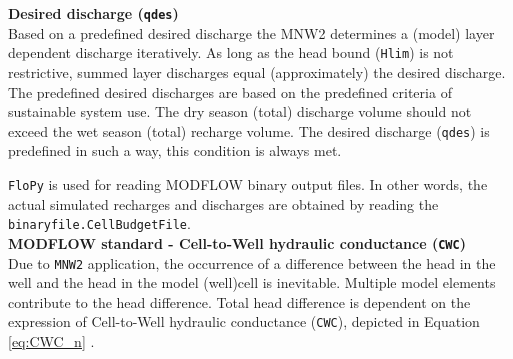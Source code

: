 \textbf{Desired discharge (\texttt{qdes})} \\
Based on a predefined desired discharge the MNW2 determines a (model) layer dependent discharge iteratively. As long as the head bound (\texttt{Hlim}) is not restrictive, summed layer discharges equal (approximately) the desired discharge. The predefined desired discharges are based on the predefined criteria of sustainable system use. The dry season (total) discharge volume should not exceed the wet season (total) recharge volume. The desired discharge (\texttt{qdes}) is predefined in such a way, this condition is always met. 
%
%
%
%

\texttt{FloPy} is used for reading MODFLOW binary output files. In other words, the actual simulated recharges and discharges are obtained by reading the \texttt{binaryfile.CellBudgetFile}. \\

\textbf{MODFLOW standard - Cell-to-Well hydraulic conductance (\texttt{CWC})} \\
Due to \texttt{MNW2} application, the occurrence of a difference between the head in the well and the head in the model (well)cell is inevitable. Multiple model elements contribute to the head difference. Total head difference is dependent on the expression of Cell-to-Well hydraulic conductance (\texttt{CWC}), depicted in Equation \ref{eq:CWC_n} \citep{LeonardF.KonikowGeorgeZ.HornbergerKeithJ.Halford2009}. 

